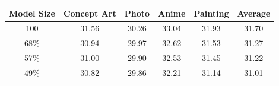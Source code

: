 \begin{table}[H]
	\centering
	{%
		
		\begin{tabular}{cccccc}
			
			\toprule
			\multicolumn{1}{c}{\textbf{Model Size}} &
			\multicolumn{1}{c}{Concept Art} &
			\multicolumn{1}{c}{Photo} &
			\multicolumn{1}{c}{Anime} &
			\multicolumn{1}{c}{Painting} &
			\multicolumn{1}{c}{Average}\\
			\midrule
		
			 \color{gray} 100  %
			& \color{gray} 31.56  %
			& \color{gray} 30.26  %
			& \color{gray} 33.04  %
			& \color{gray} 31.93  %
			& \color{gray} 31.70  %
			\\
			\midrule

%

			68\% &    %
			30.94 &    %
			29.97 &    %
			32.62 &    %
			31.53 &    %
			31.27    %
			\\
		
			57\% &    %
			31.00 &    %
			29.90 &    %
			32.53 &    %
			31.45 &    %
			31.22     %
			\\
		
			49\% &    %
			30.82 &    %
			29.86 &    %
			32.21 &    %
			31.14 &    %
			31.01     %
			\\


\end{tabular}}
\end{table}
